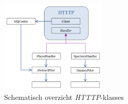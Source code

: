 \documentclass[eind]{penoverslag}
\begin{document}
\begin{figure}[h]
\centering
	\includegraphics[width=0.45\textwidth]{KlasHTTTP}
\caption{Schematisch overzicht \textit{HTTTP}-klasses}
\label{fig:klasHTTTP}
\end{figure} 
\end{document}

